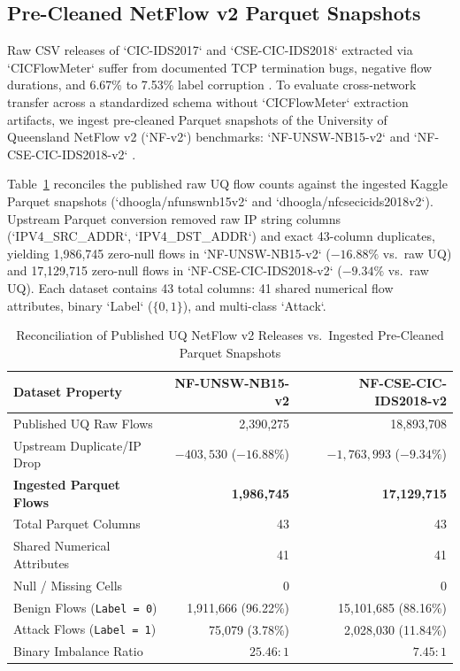 ﻿\documentclass[conference]{IEEEtran}
\begin{document}
\subsection{Pre-Cleaned NetFlow v2 Parquet Snapshots}
Raw CSV releases of `CIC-IDS2017` and `CSE-CIC-IDS2018` extracted via `CICFlowMeter` suffer from documented TCP termination bugs, negative flow durations, and 6.67\% to 7.53\% label corruption \cite{b3,b4,b5}. To evaluate cross-network transfer across a standardized schema without `CICFlowMeter` extraction artifacts, we ingest pre-cleaned Parquet snapshots of the University of Queensland NetFlow v2 (`NF-v2`) benchmarks: `NF-UNSW-NB15-v2` and `NF-CSE-CIC-IDS2018-v2` \cite{b2}.

Table~\ref{tab:dataset_provenance} reconciles the published raw UQ flow counts \cite{b2} against the ingested Kaggle Parquet snapshots (`dhoogla/nfunswnb15v2` and `dhoogla/nfcsecicids2018v2`). Upstream Parquet conversion removed raw IP string columns (`IPV4_SRC_ADDR`, `IPV4_DST_ADDR`) and exact 43-column duplicates, yielding 1,986,745 zero-null flows in `NF-UNSW-NB15-v2` ($-16.88\%$ vs.\ raw UQ) and 17,129,715 zero-null flows in `NF-CSE-CIC-IDS2018-v2` ($-9.34\%$ vs.\ raw UQ). Each dataset contains 43 total columns: 41 shared numerical flow attributes, binary `Label` ($\{0, 1\}$), and multi-class `Attack`.

\begin{table}[t]
\caption{Reconciliation of Published UQ NetFlow v2 Releases vs.\ Ingested Pre-Cleaned Parquet Snapshots}
\begin{center}
\begin{tabular}{|l|r|r|}
\hline
\textbf{Dataset Property} & \textbf{NF-UNSW-NB15-v2} & \textbf{NF-CSE-CIC-IDS2018-v2} \\
\hline
Published UQ Raw Flows \cite{b2} & 2,390,275 & 18,893,708 \\
Upstream Duplicate/IP Drop & $-403,530$ ($-16.88\%$) & $-1,763,993$ ($-9.34\%$) \\
\textbf{Ingested Parquet Flows} & \textbf{1,986,745} & \textbf{17,129,715} \\
\hline
Total Parquet Columns & 43 & 43 \\
Shared Numerical Attributes & 41 & 41 \\
Null / Missing Cells & 0 & 0 \\
\hline
Benign Flows (\texttt{Label = 0}) & 1,911,666 (96.22\%) & 15,101,685 (88.16\%) \\
Attack Flows (\texttt{Label = 1}) & 75,079 (3.78\%) & 2,028,030 (11.84\%) \\
Binary Imbalance Ratio & $25.46 : 1$ & $7.45 : 1$ \\
\hline
\end{tabular}
\label{tab:dataset_provenance}
\end{center}
\end{table}
\end{document}
